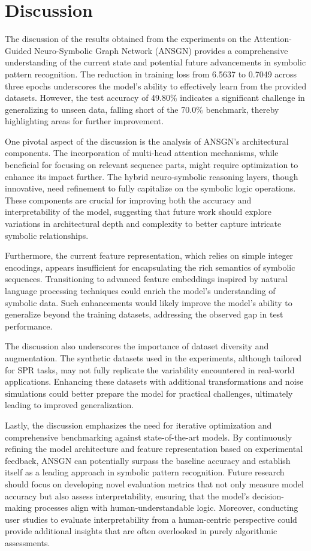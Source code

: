 \documentclass{article}
\begin{document}
\section{Discussion}
The discussion of the results obtained from the experiments on the Attention-Guided Neuro-Symbolic Graph Network (ANSGN) provides a comprehensive understanding of the current state and potential future advancements in symbolic pattern recognition. The reduction in training loss from 6.5637 to 0.7049 across three epochs underscores the model's ability to effectively learn from the provided datasets. However, the test accuracy of 49.80\% indicates a significant challenge in generalizing to unseen data, falling short of the 70.0\% benchmark, thereby highlighting areas for further improvement.

One pivotal aspect of the discussion is the analysis of ANSGN's architectural components. The incorporation of multi-head attention mechanisms, while beneficial for focusing on relevant sequence parts, might require optimization to enhance its impact further. The hybrid neuro-symbolic reasoning layers, though innovative, need refinement to fully capitalize on the symbolic logic operations. These components are crucial for improving both the accuracy and interpretability of the model, suggesting that future work should explore variations in architectural depth and complexity to better capture intricate symbolic relationships.

Furthermore, the current feature representation, which relies on simple integer encodings, appears insufficient for encapsulating the rich semantics of symbolic sequences. Transitioning to advanced feature embeddings inspired by natural language processing techniques could enrich the model's understanding of symbolic data. Such enhancements would likely improve the model's ability to generalize beyond the training datasets, addressing the observed gap in test performance.

The discussion also underscores the importance of dataset diversity and augmentation. The synthetic datasets used in the experiments, although tailored for SPR tasks, may not fully replicate the variability encountered in real-world applications. Enhancing these datasets with additional transformations and noise simulations could better prepare the model for practical challenges, ultimately leading to improved generalization.

Lastly, the discussion emphasizes the need for iterative optimization and comprehensive benchmarking against state-of-the-art models. By continuously refining the model architecture and feature representation based on experimental feedback, ANSGN can potentially surpass the baseline accuracy and establish itself as a leading approach in symbolic pattern recognition. Future research should focus on developing novel evaluation metrics that not only measure model accuracy but also assess interpretability, ensuring that the model's decision-making processes align with human-understandable logic. Moreover, conducting user studies to evaluate interpretability from a human-centric perspective could provide additional insights that are often overlooked in purely algorithmic assessments.
\end{document}
